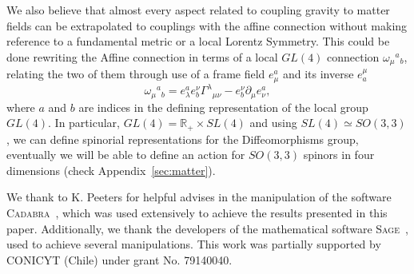 \documentclass[twocolumn,aps,showpacs,showkeys,prl,superscriptaddress]{revtex4-1}
\begin{document}
We also believe that almost every aspect related to coupling gravity to matter fields can be extrapolated to couplings with the affine connection without making reference to a fundamental metric or a local Lorentz Symmetry. This could be  done rewriting the Affine connection in terms of a local $GL(4)$ connection
$\omega_{\mu}{}^a{}_b$, relating the two of them through use of a frame field $e_\mu^a$ and its inverse $e^\mu_a$
\begin{equation}
  \omega_{\mu}{}^a{}_b = e_\lambda^a e_b^\nu \Gamma^{\lambda}{}_{\mu\nu} -  e_b^\nu\partial_{\mu}e_\nu^a,
\end{equation} where $a$ and $b$ are indices in the defining representation of the local group $GL(4)$.
 In particular, \mbox{$GL(4) = \mathbb{R}_+ \times SL(4)$} and using \mbox{$SL(4) \simeq SO(3,3)$,} we can define spinorial representations for the Diffeomorphisms group, eventually we will be able to define an action for $SO(3,3)$ spinors in four dimensions (check Appendix~\ref{sec:matter}).


\begin{acknowledgments}
  We thank to K. Peeters for helpful advises in the manipulation of the software \textsc{Cadabra}~\cite{Peeters:2007wn,*peeters2007symbolic,*Peeters2007550}, which was used extensively to achieve the results presented in this paper. Additionally, we thank the developers of the mathematical software \textsc{Sage}~\cite{sage}, used to achieve several manipulations. This work was partially supported by CONICYT (Chile) under grant No. 79140040.
\end{acknowledgments}




\end{document}
